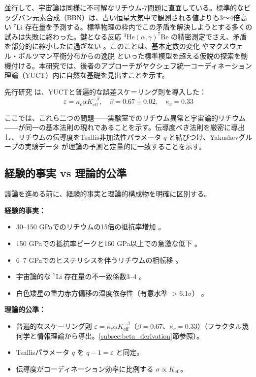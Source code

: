 \documentclass[11pt,a4paper]{article}
\newcommand{\Ke}{K_{\mathrm{eff}}}
\newcommand{\kappac}{\kappa_c}
\newcommand{\alp}{\alpha}
\theoremstyle{remark}
\begin{document}
	並行して、宇宙論は同様に不可解なリチウム-7問題に直面している。標準的なビッグバン元素合成（BBN）は、古い恒星大気中で観測される値よりも3～4倍高い \(^7\)Li 存在量を予測する。標準物理の枠内でこの矛盾を解決しようとする多くの試みは失敗に終わった。鍵となる反応 \(^3\mathrm{He}(\alpha,\gamma)^7\mathrm{Be}\) の精密測定でさえ、矛盾を部分的に縮小したに過ぎない \cite{IAEA2017}。このことは、基本定数の変化 \cite{HAL2006} やマクスウェル・ボルツマン平衡分布からの逸脱 \cite{bertulani2015} といった標準模型を超える仮説の探索を動機付ける。本研究では、後者のアプローチがヤクシェフ統一コーディネーション理論（YUCT）内に自然な基礎を見出すことを示す。
	
	先行研究 \cite{yuct2026, appendixL, appendixC} は、YUCTと普遍的な誤差スケーリング則を導入した：
	\begin{equation}
		\varepsilon = \kappac \alp \Ke^{-\beta}, \quad \beta = 0.67 \pm 0.02, \quad \kappac = 0.33
		\label{eq:universal}
	\end{equation}
	
	ここでは、これら二つの問題――実験室でのリチウム異常と宇宙論的リチウム――が同一の基本法則の現れであることを示す。伝導度べき法則を厳密に導出し、リチウムの伝導度をTsallis非加法性パラメータ \(q\) と結びつけ、Yakushevグループの実験データ \cite{fortov2001, yakushev2002} が理論の予測と定量的に一致することを示す。
	
	\subsection{経験的事実 vs 理論的公準}
	
	議論を進める前に、経験的事実と理論的構成物を明確に区別する。
	
	\textbf{経験的事実：}
	\begin{itemize}
		\item 30–150 GPaでのリチウムの15倍の抵抗率増加 \cite{fortov2001}。
		\item 150 GPaでの抵抗率ピークと160 GPa以上での急激な低下 \cite{yakushev2002}。
		\item 6–7 GPaでのヒステリシスを伴うリチウムの相転移 \cite{orlov2001}。
		\item 宇宙論的な \(^7\)Li 存在量の不一致係数3–4 \cite{bertulani2015}。
		\item 白色矮星の重力赤方偏移の温度依存性（有意水準 \(>6.1\sigma\)） \cite{Crumpler2024}。
	\end{itemize}
	
	\textbf{理論的公準：}
	\begin{itemize}
		\item 普遍的なスケーリング則 \(\varepsilon = \kappac \alp \Ke^{-\beta}\)（\(\beta = 0.67\)、\(\kappac = 0.33\)）（フラクタル幾何学と情報理論から導出。\ref{subsec:beta_derivation}節参照）。
		\item Tsallisパラメータ \(q\) を \(q-1 = \varepsilon\) と同定。
		\item 伝導度がコーディネーション効率に比例する \(\sigma \propto \Ke\)。
	\end{itemize}
	
\end{document}
